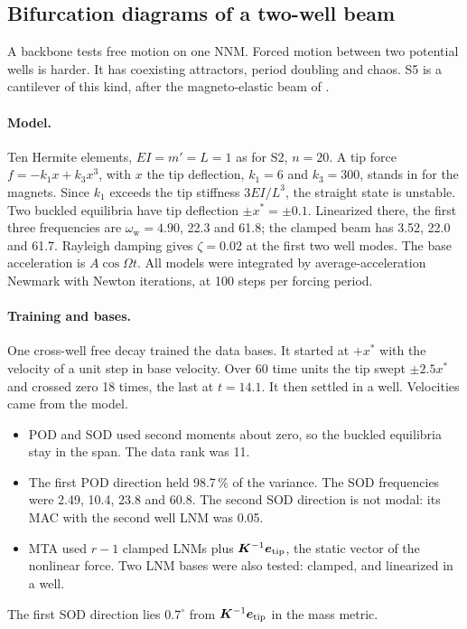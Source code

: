 \documentclass[preprint,12pt]{elsarticle}
\begin{document}
\subsection{Bifurcation diagrams of a two-well beam}\label{sec:moon}
A backbone tests free motion on one NNM. Forced motion between two potential wells is harder. It has coexisting attractors, period doubling and chaos. S5 is a cantilever of this kind, after the magneto-elastic beam of \citet{Moon1979}.

\paragraph{Model.} Ten Hermite elements, $EI=m'=L=1$ as for S2, $n=20$. A tip force $f=-k_1x+k_3x^3$, with $x$ the tip deflection, $k_1=6$ and $k_3=300$, stands in for the magnets. Since $k_1$ exceeds the tip stiffness $3EI/L^3$, the straight state is unstable. Two buckled equilibria have tip deflection $\pm x^*=\pm0.1$. Linearized there, the first three frequencies are $\omega_{\mathrm w}=4.90$, 22.3 and 61.8; the clamped beam has 3.52, 22.0 and 61.7. Rayleigh damping gives $\zeta=0.02$ at the first two well modes. The base acceleration is $A\cos\varOmega t$. All models were integrated by average-acceleration Newmark \citep{Newmark1959} with Newton iterations, at 100 steps per forcing period.

\paragraph{Training and bases.} One cross-well free decay trained the data bases. It started at $+x^*$ with the velocity of a unit step in base velocity. Over 60 time units the tip swept $\pm2.5x^*$ and crossed zero 18 times, the last at $t=14.1$. It then settled in a well. Velocities came from the model.
\begin{itemize}
\item POD and SOD used second moments about zero, so the buckled equilibria stay in the span. The data rank was 11.
\item The first POD direction held 98.7\,\% of the variance. The SOD frequencies were 2.49, 10.4, 23.8 and 60.8. The second SOD direction is not modal: its MAC with the second well LNM was 0.05.
\item MTA used $r-1$ clamped LNMs plus $\bm{K}^{-1}\bm{e}_{\mathrm{tip}}$, the static vector of the nonlinear force. Two LNM bases were also tested: clamped, and linearized in a well.
\end{itemize}
The first SOD direction lies $0.7^\circ$ from $\bm{K}^{-1}\bm{e}_{\mathrm{tip}}$ in the mass metric.
\end{document}
